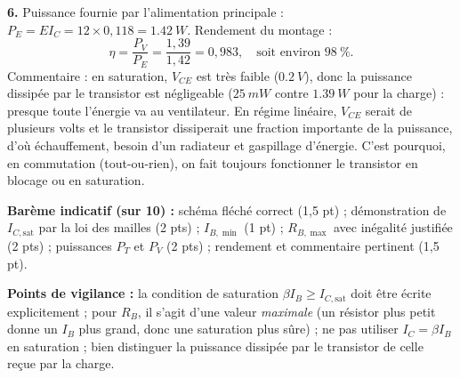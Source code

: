\documentclass[11pt]{article}
\begin{document}
\begin{corrige}
\textbf{6.} Puissance fournie par l'alimentation principale : $P_E = E I_C = 12 \times 0,118 = \SI{1,42}{W}$. Rendement du montage :
\[ \eta = \frac{P_V}{P_E} = \frac{1,39}{1,42} = 0,983, \quad \text{soit environ } 98~\%. \]
Commentaire : en saturation, $V_{CE}$ est très faible ($\SI{0,2}{V}$), donc la puissance dissipée par le transistor est négligeable ($\SI{25}{mW}$ contre $\SI{1,39}{W}$ pour la charge) : presque toute l'énergie va au ventilateur. En régime linéaire, $V_{CE}$ serait de plusieurs volts et le transistor dissiperait une fraction importante de la puissance, d'où échauffement, besoin d'un radiateur et gaspillage d'énergie. C'est pourquoi, en commutation (tout-ou-rien), on fait toujours fonctionner le transistor en blocage ou en saturation.

\textbf{Barème indicatif (sur 10) :} schéma fléché correct (1,5 pt) ; démonstration de $I_{C,\text{sat}}$ par la loi des mailles (2 pts) ; $I_{B,\min}$ (1 pt) ; $R_{B,\max}$ avec inégalité justifiée (2 pts) ; puissances $P_T$ et $P_V$ (2 pts) ; rendement et commentaire pertinent (1,5 pt).

\textbf{Points de vigilance :} la condition de saturation $\beta I_B \geq I_{C,\text{sat}}$ doit être écrite explicitement ; pour $R_B$, il s'agit d'une valeur \emph{maximale} (un résistor plus petit donne un $I_B$ plus grand, donc une saturation plus sûre) ; ne pas utiliser $I_C = \beta I_B$ en saturation ; bien distinguer la puissance dissipée par le transistor de celle reçue par la charge.
\end{corrige}
\end{document}
